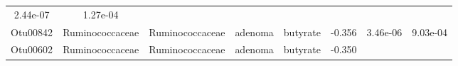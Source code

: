 \documentclass[11pt,]{article}
\begin{document}
\begin{longtable}[]{@{}cccccccc@{}}
\begin{minipage}[t]{0.08\columnwidth}
2.44e-07\strut
\end{minipage} & \begin{minipage}[t]{0.08\columnwidth}\centering\strut
1.27e-04\strut
\end{minipage}\tabularnewline
\begin{minipage}[t]{0.08\columnwidth}\centering\strut
Otu00842\strut
\end{minipage} & \begin{minipage}[t]{0.15\columnwidth}\centering\strut
Ruminococcaceae\strut
\end{minipage} & \begin{minipage}[t]{0.15\columnwidth}\centering\strut
Ruminococcaceae\strut
\end{minipage} & \begin{minipage}[t]{0.08\columnwidth}\centering\strut
adenoma\strut
\end{minipage} & \begin{minipage}[t]{0.09\columnwidth}\centering\strut
butyrate\strut
\end{minipage} & \begin{minipage}[t]{0.07\columnwidth}\centering\strut
-0.356\strut
\end{minipage} & \begin{minipage}[t]{0.08\columnwidth}\centering\strut
3.46e-06\strut
\end{minipage} & \begin{minipage}[t]{0.08\columnwidth}\centering\strut
9.03e-04\strut
\end{minipage}\tabularnewline
\begin{minipage}[t]{0.08\columnwidth}\centering\strut
Otu00602\strut
\end{minipage} & \begin{minipage}[t]{0.15\columnwidth}\centering\strut
Ruminococcaceae\strut
\end{minipage} & \begin{minipage}[t]{0.15\columnwidth}\centering\strut
Ruminococcaceae\strut
\end{minipage} & \begin{minipage}[t]{0.08\columnwidth}\centering\strut
adenoma\strut
\end{minipage} & \begin{minipage}[t]{0.09\columnwidth}\centering\strut
butyrate\strut
\end{minipage} & \begin{minipage}[t]{0.07\columnwidth}\centering\strut
-0.350\strut
\end{minipage} & \begin{minipage}[t]{0.08\columnwidth}\centering\strut

\end{minipage}
\end{longtable}
\end{document}
